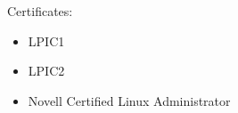 \ecvitem{}
{
  Certificates:
  \begin{itemize}
    \item LPIC1
    \item LPIC2
    \item Novell Certified Linux Administrator
  \end{itemize}

}
